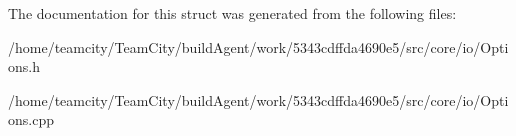 The documentation for this struct was generated from the following files\+:\begin{DoxyCompactItemize}
\item 
/home/teamcity/\+Team\+City/build\+Agent/work/5343cdffda4690e5/src/core/io/Options.\+h\item 
/home/teamcity/\+Team\+City/build\+Agent/work/5343cdffda4690e5/src/core/io/Options.\+cpp\end{DoxyCompactItemize}
